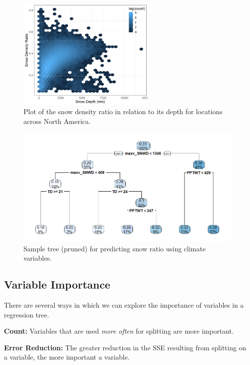 \documentclass[12pt]{../notes}
\begin{document}
\begin{figure}[H]
\centering
\includegraphics[width = 0.6\textwidth]{../figures/module4/snowRatio.png}
\caption{Plot of the snow density ratio in relation to its depth for locations across North America.}
\end{figure}

\begin{figure}[H]
\centering
\includegraphics[width = \textwidth]{../figures/module4/sampleTree.png}
\caption{Sample tree (pruned) for predicting snow ratio using climate variables.}
\end{figure}

\subsection{Variable Importance}
There are several ways in which we can explore the importance of variables in a regression tree. 
\bi
\item \textbf{Count:} Variables that are used \textit{more often} for splitting are more important. 
\item \textbf{Error Reduction:} The greater reduction in the SSE resulting from splitting on a variable, the more important a variable. 
\ei
\end{document}
